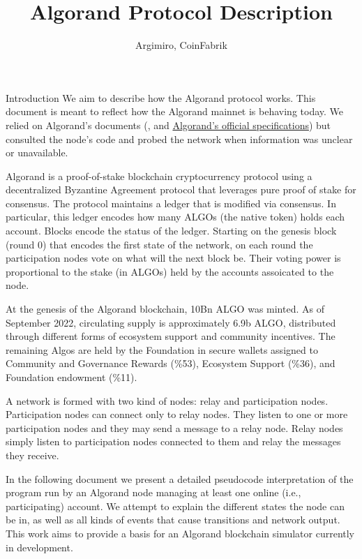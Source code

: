 \documentclass[10pt,a4paper]{article}
\author{Argimiro, CoinFabrik}
\title{Algorand Protocol Description}
\begin{document}
\maketitle
\tableofcontents

\begin{section}{Introduction}
We aim to describe how the Algorand protocol works. 
This document is meant to reflect how the Algorand mainnet is behaving
today. We relied on Algorand's documents (\cite{DBLP:conf/sosp/GiladHMVZ17},
\cite{DBLP:journals/corr/Micali16} and 
\href{https://github.com/algorandfoundation/specs}{Algorand's official specifications})
but consulted the node's code and probed the network when information was unclear or 
unavailable.

Algorand is a proof-of-stake blockchain cryptocurrency protocol 
using a decentralized Byzantine Agreement protocol that leverages 
pure proof of stake for consensus. The protocol maintains a ledger
that is modified via consensus. In particular, this ledger encodes
how many ALGOs (the native token) holds each account.
Blocks encode the status of the ledger. Starting on the genesis
block (round 0) that encodes the first state of the network, 
on each round the participation nodes vote on what will the next
block be. Their voting power is proportional to the stake (in ALGOs) 
held by the accounts assoicated to the node.

At the genesis of the Algorand blockchain, 10Bn ALGO was minted. 
As of September 2022, circulating supply is approximately 6.9b ALGO, 
distributed through different forms of ecosystem support and 
community incentives. 
The remaining Algos are held by the Foundation in secure wallets 
assigned to 
Community and Governance Rewards (\%53), 
Ecosystem Support (\%36), and 
Foundation endowment (\%11).

A network is formed with two kind of nodes: relay and participation 
nodes. Participation nodes can connect only to relay nodes. 
They listen to one or more participation nodes and they may 
send a message to a relay node. Relay nodes simply listen to participation
nodes connected to them and relay the messages they receive.

In the following document we present a detailed pseudocode interpretation 
of the program run by an Algorand node managing at least one online (i.e., 
participating) account. We attempt to explain the different states the node 
can be in, as well as all kinds of events that cause transitions and network 
output. This work aims to provide a basis for an Algorand blockchain simulator 
currently in development. 

\end{section}
\end{document}
